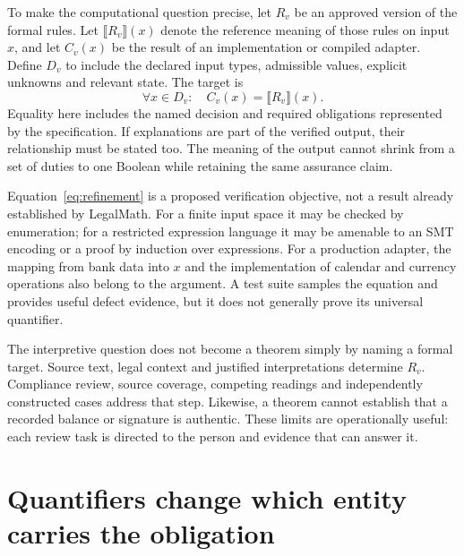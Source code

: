 To make the computational question precise, let $R_v$ be an approved version of
the formal rules. Let $\llbracket R_v\rrbracket(x)$ denote the reference meaning
of those rules on input $x$, and let $C_v(x)$ be the result of an implementation
or compiled adapter. Define $D_v$ to include the declared input types, admissible
values, explicit unknowns and relevant state. The target is
\begin{equation}
 \forall x\in D_v:\quad C_v(x)=\llbracket R_v\rrbracket(x).
 \label{eq:refinement}
\end{equation}
Equality here includes the named decision and required obligations represented by
the specification. If explanations are part of the verified output, their
relationship must be stated too. The meaning of the output cannot shrink from a
set of duties to one Boolean while retaining the same assurance claim.


Equation~\eqref{eq:refinement} is a proposed verification objective, not a result
already established by LegalMath. For a finite input space it may be checked by
enumeration; for a restricted expression language it may be amenable to an SMT
encoding or a proof by induction over expressions. For a production adapter,
the mapping from bank data into $x$ and the implementation of calendar and
currency operations also belong to the argument. A test suite samples the
equation and provides useful defect evidence, but it does not generally prove its
universal quantifier.

The interpretive question does not become a theorem simply by naming a formal
target. Source text, legal context and justified interpretations determine
$R_v$. Compliance review, source coverage, competing readings and independently
constructed cases address that step. Likewise, a theorem cannot establish that
a recorded balance or signature is authentic. These limits are operationally
useful: each review task is directed to the person and evidence that can answer it.

\section{Quantifiers change which entity carries the obligation}
\label{merge:M03:01}


